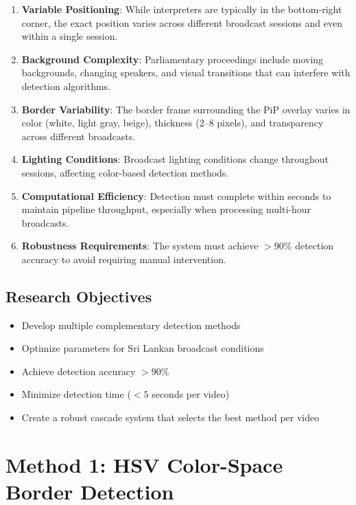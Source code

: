 \documentclass[11pt,a4paper]{article}
\begin{document}
\begin{enumerate}[leftmargin=*]
    \item \textbf{Variable Positioning}: While interpreters are typically in the bottom-right corner, the exact position varies across different broadcast sessions and even within a single session.
    
    \item \textbf{Background Complexity}: Parliamentary proceedings include moving backgrounds, changing speakers, and visual transitions that can interfere with detection algorithms.
    
    \item \textbf{Border Variability}: The border frame surrounding the PiP overlay varies in color (white, light gray, beige), thickness (2--8 pixels), and transparency across different broadcasts.
    
    \item \textbf{Lighting Conditions}: Broadcast lighting conditions change throughout sessions, affecting color-based detection methods.
    
    \item \textbf{Computational Efficiency}: Detection must complete within seconds to maintain pipeline throughput, especially when processing multi-hour broadcasts.
    
    \item \textbf{Robustness Requirements}: The system must achieve $>90\%$ detection accuracy to avoid requiring manual intervention.
\end{enumerate}

\subsection{Research Objectives}

\begin{itemize}
    \item Develop multiple complementary detection methods
    \item Optimize parameters for Sri Lankan broadcast conditions
    \item Achieve detection accuracy $>90\%$
    \item Minimize detection time ($<5$ seconds per video)
    \item Create a robust cascade system that selects the best method per video
\end{itemize}

\section{Method 1: HSV Color-Space Border Detection}
\end{document}
